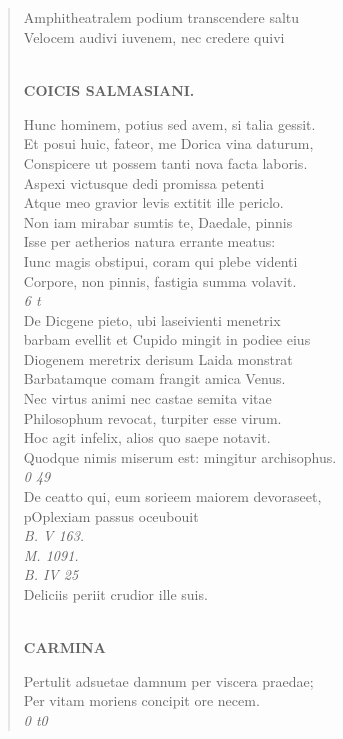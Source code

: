 \documentclass[11pt, a4paper]{report}
\begin{document}
            \subsection*{}
      \begin{verse}
      Amphitheatralem podium transcendere saltu \\ Velocem audivi iuvenem, nec credere quivi \\ 
        ﻿\pagebreak 
    \begin{center} \textbf{COICIS SALMASIANI.} \end{center} \marginpar{[287]} Hunc hominem, potius sed avem, si talia gessit. \\ Et posui huic, fateor, me Dorica vina daturum, \\ Conspicere ut possem tanti nova facta laboris. \\ Aspexi victusque dedi promissa petenti \\ Atque meo gravior levis extitit ille periclo. \\ Non iam mirabar sumtis te, Daedale, pinnis \\ Isse per aetherios natura errante meatus: \\ Iunc magis obstipui, coram qui plebe videnti \\ Corpore, non pinnis, fastigia summa volavit. \\ \textit{6 t} \\ De Dicgene pieto, ubi laseivienti menetrix \\ barbam evellit et Cupido mingit in podiee eius \\ Diogenem meretrix derisum Laida monstrat \\ Barbatamque comam frangit amica Venus. \\ Nec virtus animi nec castae semita vitae \\ Philosophum revocat, turpiter esse virum. \\ Hoc agit infelix, alios quo saepe notavit. \\ Quodque nimis miserum est: mingitur archisophus. \\ \textit{0 49} \\ De ceatto qui, eum sorieem maiorem devoraseet, \\ pOplexiam passus oceubouit \\ \textit{B. V 163.} \\ \textit{M. 1091.} \\ \textit{B. IV 25} \\ Deliciis periit crudior ille suis. \\ 
        ﻿\pagebreak 
     \marginpar{[288]} \begin{center} \textbf{CARMINA} \end{center}Pertulit adsuetae damnum per viscera praedae; \\ Per vitam moriens concipit ore necem. \\ \textit{0 t0} \\ 
      \end{verse}
  
\end{document}
